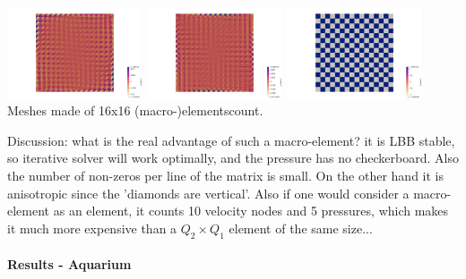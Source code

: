 \begin{center}
\includegraphics[width=4cm]{python_codes/fieldstone_78/results/mms_dh/16x16/perror5}
\includegraphics[width=4cm]{python_codes/fieldstone_78/results/mms_dh/16x16/perror6}
\includegraphics[width=4cm]{python_codes/fieldstone_78/results/mms_dh/16x16/perror7}\\
{\captionfont Meshes  made of 16x16 (macro-)elementscount.} 
\end{center}



Discussion: what is the real advantage of such a macro-element? it is LBB stable, so 
iterative solver will work optimally, and the pressure has no checkerboard. 
Also the number of non-zeros per line of the matrix is small.  
On the other hand it is anisotropic since the 'diamonds are vertical'. 
Also if one would consider a macro-element as an element, it counts 10 velocity nodes and 5 pressures, 
which makes it much more expensive than a $Q_2\times Q_1$ element of the same size...






\newpage
\paragraph{Results - Aquarium}


